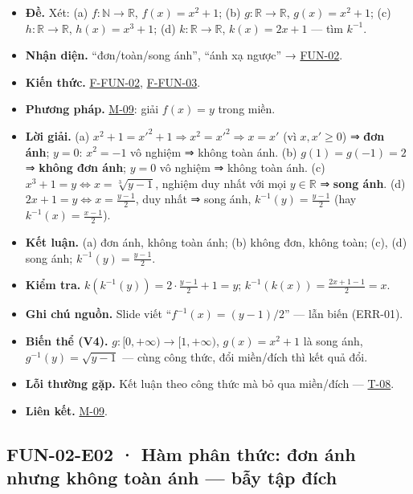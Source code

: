 \documentclass[
  10pt,
  twoside,openany]{book}
\providecommand{\tightlist}{%
  \setlength{\itemsep}{0pt}\setlength{\parskip}{0pt}}
\begin{document}
\begin{itemize}
\tightlist
\item
  \textbf{Đề.} Xét: (a) \(f:\mathbb N\to\mathbb R\), \(f(x)=x^2+1\); (b)
  \(g:\mathbb R\to\mathbb R\), \(g(x)=x^2+1\); (c)
  \(h:\mathbb R\to\mathbb R\), \(h(x)=x^3+1\); (d)
  \(k:\mathbb R\to\mathbb R\), \(k(x)=2x+1\) --- tìm \(k^{-1}\).
\item
  \textbf{Nhận diện.} ``đơn/toàn/song ánh'', ``ánh xạ ngược'' →
  \protect\hyperlink{FUN-02}{FUN-02}.
\item
  \textbf{Kiến thức.} \protect\hyperlink{F-FUN-02}{F-FUN-02},
  \protect\hyperlink{F-FUN-03}{F-FUN-03}.
\item
  \textbf{Phương pháp.} \protect\hyperlink{M-09}{M-09}: giải \(f(x)=y\)
  trong miền.
\item
  \textbf{Lời giải.} (a)
  \(x^2+1=x'^2+1\Rightarrow x^2=x'^2\Rightarrow x=x'\) (vì \(x,x'\ge0\))
  ⇒ \textbf{đơn ánh}; \(y=0\): \(x^2=-1\) vô nghiệm ⇒ không toàn ánh.
  (b) \(g(1)=g(-1)=2\) ⇒ \textbf{không đơn ánh}; \(y=0\) vô nghiệm ⇒
  không toàn ánh. (c) \(x^3+1=y\Leftrightarrow x=\sqrt[3]{y-1}\), nghiệm
  duy nhất với mọi \(y\in\mathbb R\) ⇒ \textbf{song ánh}. (d)
  \(2x+1=y\Leftrightarrow x=\frac{y-1}{2}\), duy nhất ⇒ song ánh,
  \(k^{-1}(y)=\frac{y-1}{2}\) (hay \(k^{-1}(x)=\frac{x-1}{2}\)).
\item
  \textbf{Kết luận.} (a) đơn ánh, không toàn ánh; (b) không đơn, không
  toàn; (c), (d) song ánh; \(k^{-1}(y)=\frac{y-1}{2}\).
\item
  \textbf{Kiểm tra.} \(k(k^{-1}(y))=2\cdot\frac{y-1}{2}+1=y\);
  \(k^{-1}(k(x))=\frac{2x+1-1}{2}=x\).
\item
  \textbf{Ghi chú nguồn.} Slide viết ``\(f^{-1}(x)=(y-1)/2\)'' --- lẫn
  biến (ERR-01).
\item
  \textbf{Biến thể (V4).} \(g:[0,+\infty)\to[1,+\infty)\),
  \(g(x)=x^2+1\) là song ánh, \(g^{-1}(y)=\sqrt{y-1}\) --- cùng công
  thức, đổi miền/đích thì kết quả đổi.
\item
  \textbf{Lỗi thường gặp.} Kết luận theo công thức mà bỏ qua miền/đích
  --- \protect\hyperlink{T-08}{T-08}.
\item
  \textbf{Liên kết.} \protect\hyperlink{M-09}{M-09}.
\end{itemize}

\hypertarget{FUN-02-E02}{%
\subsection{FUN-02-E02 · Hàm phân thức: đơn ánh nhưng không toàn ánh ---
bẫy tập đích}\label{FUN-02-E02}}
\end{document}
